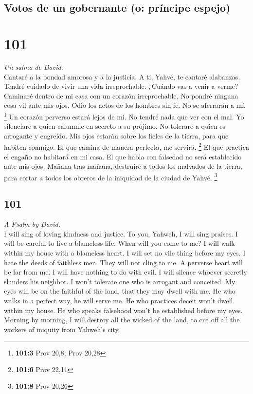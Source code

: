 \begin{paracol}{2}
\hypertarget{votos-de-un-gobernante-o-pruxedncipe-espejo}{%
\subsection{Votos de un gobernante (o: príncipe
espejo)}\label{votos-de-un-gobernante-o-pruxedncipe-espejo}}

\hypertarget{section-200}{%
\section{101}\label{section-200}}

\emph{Un salmo de David.}\\
 Cantaré a la bondad amorosa y a la justicia. A ti, Yahvé,
te cantaré alabanzas.  Tendré cuidado de vivir una vida
irreprochable. ¿Cuándo vas a venir a verme? Caminaré dentro de mi casa
con un corazón irreprochable.  No pondré ninguna cosa vil
ante mis ojos. Odio los actos de los hombres sin fe. No se aferrarán a
mí. \footnote{\textbf{101:3} Prov 20,8; Prov 20,28}  Un
corazón perverso estará lejos de mí. No tendré nada que ver con el mal.
 Yo silenciaré a quien calumnie en secreto a su prójimo.
No toleraré a quien es arrogante y engreído.  Mis ojos
estarán sobre los fieles de la tierra, para que habiten conmigo. El que
camina de manera perfecta, me servirá. \footnote{\textbf{101:6} Prov
  22,11}  El que practica el engaño no habitará en mi
casa. El que habla con falsedad no será establecido ante mis ojos.
 Mañana tras mañana, destruiré a todos los malvados de la
tierra, para cortar a todos los obreros de la iniquidad de la ciudad de
Yahvé. \footnote{\textbf{101:8} Prov 20,26}

\switchcolumn
\begin{otherlanguage}{english}

\hypertarget{section-201}{%
\section{101}\label{section-201}}

\emph{A Psalm by David.}\\
 I will sing of loving kindness and justice. To you,
Yahweh, I will sing praises.  I will be careful to live a
blameless life. When will you come to me? I will walk within my house
with a blameless heart.  I will set no vile thing before
my eyes. I hate the deeds of faithless men. They will not cling to me.
 A perverse heart will be far from me. I will have nothing
to do with evil.  I will silence whoever secretly slanders
his neighbor. I won't tolerate one who is arrogant and conceited.
 My eyes will be on the faithful of the land, that they
may dwell with me. He who walks in a perfect way, he will serve me.
 He who practices deceit won't dwell within my house. He
who speaks falsehood won't be established before my eyes. 
Morning by morning, I will destroy all the wicked of the land, to cut
off all the workers of iniquity from Yahweh's city.


\end{otherlanguage}
\end{paracol}
